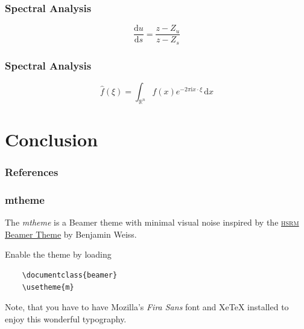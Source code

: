 \documentclass[12pt, compress]{beamer}
\begin{document}
\begin{frame}[fragile]
	\frametitle{Spectral Analysis}
	
	\begin{center}
		
		\hspace{1cm}
		
	\end{center}
	
	\begin{equation*}
		\frac{\text{d}u}{\text{d}s} = \frac{z - Z_u}{z - Z_s}
	\end{equation*}
	
\end{frame}

\begin{frame}[fragile]
	\frametitle{Spectral Analysis}
	
	\begin{center}
		
		\hspace{1cm}
		
	\end{center}
	
	\begin{equation*}
		\widehat{f}(\xi) = \int_{\mathbb{R}^n} f(x) e^{-2 \pi \text{i} x \cdot \xi} \, \text{d}x
	\end{equation*}
	
\end{frame}

\section{Conclusion}


\begin{frame}
	\frametitle{References}
	
	
\end{frame}





\begin{frame}[fragile]
  \frametitle{mtheme}

  The \emph{mtheme} is a Beamer theme with minimal visual noise inspired by the
  \href{https://github.com/hsrmbeamertheme/hsrmbeamertheme}{\textsc{hsrm} Beamer
  Theme} by Benjamin Weiss.

  Enable the theme by loading

  \begin{verbatim}
    \documentclass{beamer}
    \usetheme{m}
  \end{verbatim}

  Note, that you have to have Mozilla's \emph{Fira Sans} font and XeTeX
  installed to enjoy this wonderful typography.
\end{frame}
\end{document}
